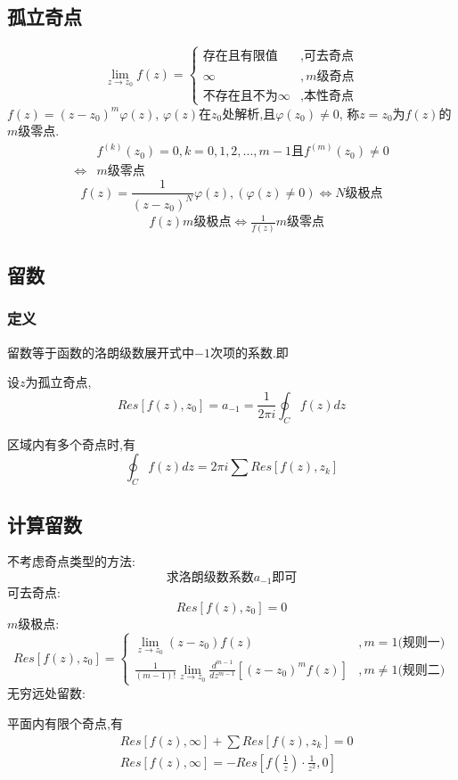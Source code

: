 \documentclass[12pt, a4paper, oneside]{ctexart}
\begin{document}
\subsection{孤立奇点}
\[
    \lim_{z \to z_0}f(z) =\begin{cases}
        \text{存在且有限值}&,\text{可去奇点}\\
        \infty &,\text{$m$级奇点}\\
        \text{不存在且不为$\infty$}&,\text{本性奇点}
    \end{cases}
\]
$f(z)=(z-z_0)^m\varphi(z)$,
$\varphi(z)$在$z_0$处解析,且$\varphi(z_0) \ne 0$,
称$z=z_0$为$f(z)$的$m$级零点.
\begin{align*}
    &f^{(k)}(z_0) = 0,k=0,1,2,...,m-1
    \text{且}f^{(m)}(z_0) \ne 0\\
    \Leftrightarrow &\text{$m$级零点}
\end{align*}
\[
    f(z)=\frac{1}{(z-z_0)^N}\varphi(z),(\varphi(z)\ne0)\Leftrightarrow\text{$N$级极点}
\]
\begin{align*}
    &f(z)\text{$m$级极点}
    \Leftrightarrow \frac{1}{f(z)}\text{$m$级零点}
\end{align*}
\subsection{留数}
\subsubsection{定义}
留数等于函数的洛朗级数展开式中$-1$次项的系数.即

设$z$为孤立奇点,
$$
    Res[f(z),z_0]=a_{-1}=\frac{1}{2\pi i}\oint_Cf(z)dz
$$

区域内有多个奇点时,有
\[
    \oint_Cf(z)dz=2\pi i\sum Res[f(z),z_k]
\]
\subsection{计算留数}
不考虑奇点类型的方法:
\[
    \text{求洛朗级数系数$a_{-1}$即可}
\]
可去奇点:
\[
    Res[f(z),z_0]=0
\]
$m$级极点:
$$
    Res[f(z),z_0] = \begin{cases}
        \lim_{z \to z_0}(z-z_0)f(z) &,m=1\text{(规则一)}\\
        \frac{1}{(m-1)!}\lim_{z \to z_0}\frac{d^{m-1}}{dz^{m-1}}[(z-z_0)^mf(z)] &,m \ne 1 \text{(规则二)}
    \end{cases}
$$
无穷远处留数:

平面内有限个奇点,有
\begin{align*}
    &Res[f(z),\infty] + \sum Res[f(z),z_k] = 0\\
    &Res[f(z),\infty] = -Res[f(\frac{1}{z})\cdot \frac{1}{z^2}, 0]
\end{align*}
\end{document}
